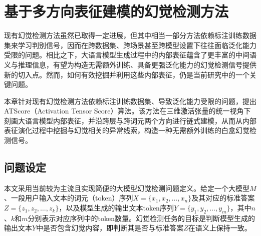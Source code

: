 \chapter{基于多方向表征建模的幻觉检测方法}\label{chp:chapter3}



现有幻觉检测方法虽然已取得一定进展，但其中相当一部分方法依赖标注训练数据集来学习判别信号，因而在跨数据集、跨场景甚至跨模型设置下往往面临泛化能力受限的问题。相比之下，大语言模型生成过程中的内部表征蕴含了更丰富的中间语义与推理信息，有望为构造无需额外训练、具备更强泛化能力的幻觉检测信号提供新的切入点。然而，如何有效挖掘并利用这些内部表征，仍是当前研究中的一个关键问题。

本章针对现有幻觉检测方法依赖标注训练数据集、导致泛化能力受限的问题，提出ATScore（Activation Tensor Score）算法。该方法在三维激活张量的统一视角下刻画大语言模型内部表征，并沿跨层与跨词元两个方向进行链式建模，从而从内部表征演化过程中挖掘与幻觉相关的异常线索，构造一种无需额外训练的白盒幻觉检测信号。

\section{问题设定}

本文采用当前较为主流且实现简便的大模型幻觉检测问题定义。给定一个大模型$M$、一段用户输入文本的词元（token）序列$X=\{x_1, x_2, \ldots, x_n\}$及其对应的标准答案$Z=\{z_1, z_2, \ldots, z_k\}$，以及模型生成的输出文本token序列$Y=\{y_1, y_2, \ldots, y_m\}$，其中$n$、$k$和$m$分别表示对应序列中的token数量。幻觉检测任务的目标是判断模型生成的输出文本$Y$中是否包含幻觉内容，即判断其是否与标准答案$Z$在语义上保持一致。

